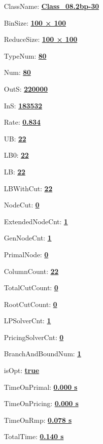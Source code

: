 \documentclass[11pt]{article}
\begin{document}
\pagestyle{empty}


ClassName: \underline{\textbf{Class_08.2bp-30}}
\par
BinSize: \underline{\textbf{100 × 100}}
\par
ReduceSize: \underline{\textbf{100 × 100}}
\par
TypeNum: \underline{\textbf{80}}
\par
Num: \underline{\textbf{80}}
\par
OutS: \underline{\textbf{220000}}
\par
InS: \underline{\textbf{183532}}
\par
Rate: \underline{\textbf{0.834}}
\par
UB: \underline{\textbf{22}}
\par
LB0: \underline{\textbf{22}}
\par
LB: \underline{\textbf{22}}
\par
LBWithCut: \underline{\textbf{22}}
\par
NodeCut: \underline{\textbf{0}}
\par
ExtendedNodeCnt: \underline{\textbf{1}}
\par
GenNodeCnt: \underline{\textbf{1}}
\par
PrimalNode: \underline{\textbf{0}}
\par
ColumnCount: \underline{\textbf{22}}
\par
TotalCutCount: \underline{\textbf{0}}
\par
RootCutCount: \underline{\textbf{0}}
\par
LPSolverCnt: \underline{\textbf{1}}
\par
PricingSolverCnt: \underline{\textbf{0}}
\par
BranchAndBoundNum: \underline{\textbf{1}}
\par
isOpt: \underline{\textbf{true}}
\par
TimeOnPrimal: \underline{\textbf{0.000 s}}
\par
TimeOnPricing: \underline{\textbf{0.000 s}}
\par
TimeOnRmp: \underline{\textbf{0.078 s}}
\par
TotalTime: \underline{\textbf{0.140 s}}
\par
\newpage


\end{document}
